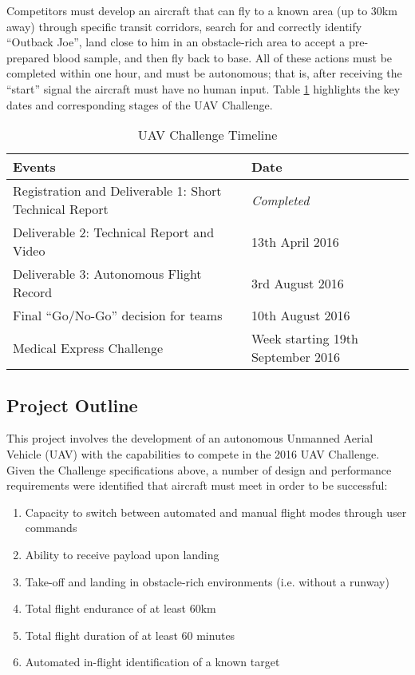 Competitors must develop an aircraft that can fly to a known area (up to 30km away) through specific transit corridors, search for and correctly identify ``Outback Joe'', land close to him in an obstacle-rich area to accept a pre-prepared blood sample, and then fly back to base. All of these actions must be completed within one hour, and must be autonomous; that is, after receiving the ``start'' signal the aircraft must have no human input. Table \ref{tab:challenge} highlights the key dates and corresponding stages of the UAV Challenge.\\

\begin{table}[!ht]
	\caption{UAV Challenge Timeline}
	\label{tab:challenge}
	\centering
	\begin{tabular}{ | l | l | }
		\hline
		\textbf{Events} & \textbf{Date} \\ \hline \hline
		Registration and Deliverable 1: Short Technical Report & \textit{Completed} \\ \hline
		Deliverable 2: Technical Report and Video & 13th April 2016 \\ \hline
		Deliverable 3: Autonomous Flight Record & 3rd August 2016 \\ \hline
		Final ``Go/No-Go'' decision for teams & 10th August 2016 \\ \hline
		Medical Express Challenge & Week starting 19th September 2016 \\
		\hline
	\end{tabular}
\end{table}

\subsection{Project Outline}
This project involves the development of an autonomous Unmanned Aerial Vehicle (UAV) with the capabilities to compete in the 2016 UAV Challenge. Given the Challenge specifications above, a number of design and performance requirements were identified that aircraft must meet in order to be successful:
\begin{enumerate}[label=\bfseries R\arabic*:] \itemsep-2pt
	\item Capacity to switch between automated and manual flight modes through user commands
	\item Ability to receive payload upon landing
	\item Take-off and landing in obstacle-rich environments (i.e. without a runway)
	\item Total flight endurance of at least 60km
	\item Total flight duration of at least 60 minutes
	\item Automated in-flight identification of a known target
\end{enumerate}

